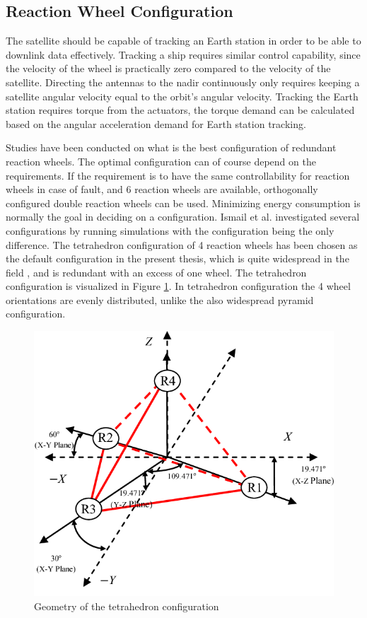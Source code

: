 \subsection{Reaction Wheel Configuration}
\label{ref:reactConfig}

The satellite should be capable of tracking an Earth station in order to be able to downlink data effectively. Tracking a ship requires similar control capability, since the velocity of the wheel is practically zero compared to the velocity of the satellite. Directing the antennas to the nadir continuously only requires keeping a satellite angular velocity equal to the orbit's angular velocity.
Tracking the Earth station requires torque from the actuators, the torque demand can be calculated based on the angular acceleration demand for Earth station tracking.


Studies have been conducted on what is the best configuration of redundant reaction wheels. The optimal configuration can of course depend on the requirements. If the requirement is to have the same controllability for reaction wheels in case of fault, and 6 reaction wheels are available, orthogonally configured double reaction wheels can be used. Minimizing energy consumption is normally the goal in deciding on a configuration. Ismail et al. \cite{ReactionWheelConfigSim} investigated several configurations by running simulations with the configuration being the only difference. The tetrahedron configuration of 4 reaction wheels has been chosen as the default configuration in the present thesis, which is quite widespread in the field \cite{reactConfigNasa}, and is redundant with an excess of one wheel. The tetrahedron configuration is visualized in Figure \ref{fig:tetrahedron}.
In tetrahedron configuration the 4 wheel orientations are evenly distributed, unlike the also widespread pyramid configuration. 

\begin{figure}[H]
	\centering 
	\includegraphics[width=120mm]{figures/tetrahedron}	
	\caption{Geometry of the tetrahedron configuration \cite{Kumar2015DesignAD}}
	\label{fig:tetrahedron}
\end{figure}

